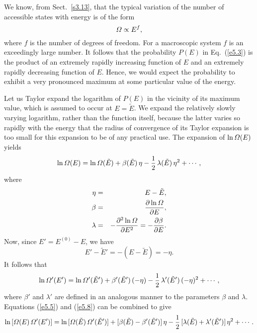 We know, from Sect.~\ref{s3.13}, that the typical variation of the number of accessible
states with energy is of the form
\begin{equation}
	{\mit\Omega} \propto E^f,\label{e5.4}
\end{equation}
where $f$ is the number of degrees of freedom. For a macroscopic system $f$ is
an exceedingly large number. It follows that the probability
$P(E)$ in Eq.~(\ref{e5.3}) is the product
of  an extremely rapidly increasing function of $E$ 
and an extremely rapidly decreasing 
function of $E$. Hence, we would expect the probability
to exhibit a very pronounced 
maximum at some particular value of the energy.

 Let us
Taylor expand the logarithm of $P(E)$ in the vicinity of its maximum value, which
is assumed to occur at $E= \tilde{E}$. We expand the relatively slowly varying
logarithm, rather than the  function itself, because the latter varies so rapidly
with the energy that the radius of convergence of its Taylor expansion
is too small for this expansion to  be of any practical use.
The expansion of $\ln {\mit\Omega}(E)$ yields
\begin{equation}
\ln {\mit\Omega}(E) = \ln{\mit\Omega}(\tilde{E}) + \beta(\tilde{E})\,\eta -
\frac{1}{2}\,\lambda
(\tilde{E})\,\eta^2+\cdots,\label{e5.5}
\end{equation}
where 
\begin{eqnarray}
\eta &=& E - \tilde{E},\\
\beta &=& \frac{\partial \ln {\mit\Omega}}{\partial E},\\
\lambda &=& -\frac{\partial ^2 \ln {\mit\Omega}}{\partial E^2}
= - \frac{\partial\beta}
{\partial E}.
\end{eqnarray}
Now, since  $E' = E^{(0)}-E$, we have
\begin{equation}
E' - \tilde{E}' = - (E-\tilde{E}) = -\eta.
\end{equation}
It follows that
\begin{equation}
\ln{\mit\Omega}'(E') = \ln{\mit\Omega}'(\tilde{E}')+\beta'(\tilde{E}')\,(-\eta) 
-\frac{1}{2}\,
\lambda'(\tilde{E}')\,(-\eta)^2
+\cdots,\label{e5.8}
\end{equation}
where $\beta'$ and $\lambda'$ are defined in an analogous manner to the parameters
$\beta$ and $\lambda$.
Equations (\ref{e5.5}) and (\ref{e5.8}) can be combined to give
\begin{equation}
\ln\,[{\mit\Omega}(E)\,{\mit\Omega}'(E')] = \ln\,[{\mit\Omega}(\tilde{E})\,{\mit\Omega}'(\tilde{E}')]
+[\beta(\tilde{E})-\beta'(\tilde{E}')]\,\eta -\frac{1}{2}\,
[\lambda(\tilde{E})+\lambda'(\tilde{E}')]\,\eta^2+\cdots.
\end{equation}
